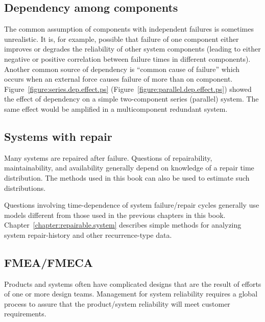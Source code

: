 \subsection{Dependency among components}
The common assumption of components with independent failures is
sometimes unrealistic. It is, for example, possible that failure of
one component either improves or degrades the reliability of other
system components (leading to either negative or positive
correlation between failure times in different components).  Another
common source of dependency is ``common cause of failure'' which
occurs when an external force causes failure of more than on
component.  Figure~\ref{figure:series.dep.effect.ps}
(Figure~\ref{figure:parallel.dep.effect.ps}) showed the effect of
dependency on a simple two-component series (parallel) system. The
same effect would be amplified in a multicomponent redundant
system.

\subsection{Systems with repair}
Many systems are repaired after failure. Questions of repairability,
maintainability, and availability generally depend on knowledge of
a repair time distribution. The methods used in this book can
also be used to estimate such distributions.

Questions involving time-dependence of system failure/repair cycles
generally use models different from those used in the previous
chapters in this book.  Chapter~\ref{chapter:repairable.system}
describes simple methods for analyzing system repair-history 
and other recurrence-type data.

\subsection{FMEA/FMECA}
\label{section:fmea.fmeca}
Products and systems often have complicated designs that are
the result of efforts of one or more design teams. Management for system
reliability requires a global process to assure that the
product/system reliability will meet customer requirements.

